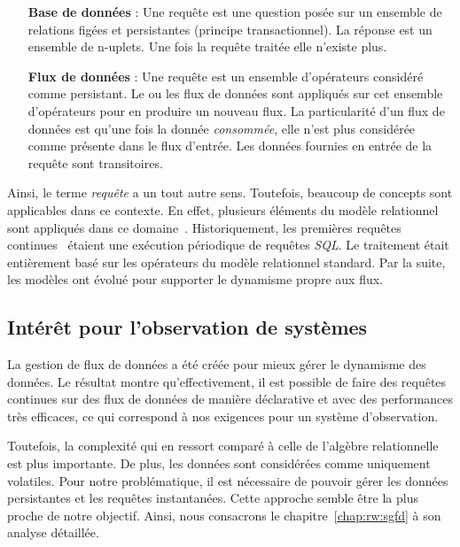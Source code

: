 \begin{itemize}
    \item[\textbf{Base de données}] : Une requête est une question posée sur un ensemble de relations figées et persistantes (principe transactionnel). La réponse est un ensemble de n-uplets. Une fois la requête traitée elle n'existe plus.
    \item[\textbf{Flux de données}] : Une requête est un ensemble d'opérateurs considéré comme persistant. Le ou les flux de données sont appliqués sur cet ensemble d'opérateurs pour en produire un nouveau flux. La particularité d'un flux de données est qu'une fois la donnée \textit{consommée}, elle n'est plus considérée comme présente dans le flux d'entrée. Les données fournies en entrée de la requête sont  transitoires.
\end{itemize}

Ainsi, le terme \textit{requête} a un tout autre sens. Toutefois, beaucoup de concepts sont applicables dans ce contexte. En effet, plusieurs éléments du modèle relationnel sont appliqués dans ce domaine~\cite{Arasu:semantic}. Historiquement, les premières requêtes continues~\cite{Terry:tapestry} étaient une exécution périodique de requêtes \textit{SQL}. Le traitement était entièrement basé sur les opérateurs du modèle relationnel standard. Par la suite, les modèles ont évolué pour supporter le dynamisme propre aux flux.

\subsection{Intérêt pour l'observation de systèmes}
La gestion de flux de données a été créée pour mieux gérer le dynamisme des données. Le résultat montre qu'effectivement, il est possible de faire des requêtes continues sur des flux de données de manière déclarative et avec des performances très efficaces, ce qui correspond à nos exigences pour un système d'observation.

Toutefois, la complexité qui en ressort comparé à celle de l'algèbre relationnelle est plus importante. De plus, les données sont considérées comme uniquement volatiles. Pour notre problématique, il est nécessaire de pouvoir gérer les données persistantes et les requêtes instantanées. Cette approche semble être la plus proche de notre objectif. Ainsi, nous consacrons le chapitre~\ref{chap:rw:sgfd} à son analyse détaillée.

